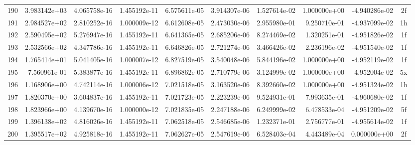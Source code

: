 \documentclass[10pt,aspectratio=1610]{beamer} %
\begin{document}
\begin{frame}
\begin{table}[htbp]
{\begin{tabular}{r r r r r r r r r c}
    190 & 3.983142e+03 & 4.065758e-16 & 1.455192e-11 & 6.575611e-05 & 3.914307e-06 & 1.527614e-02 & 1.000000e+00 & -4.940286e-02 & 2f \\
    191 & 2.984527e+02 & 2.810252e-16 & 1.000009e-12 & 6.612608e-05 & 2.473030e-06 & 2.955980e-01 & 9.250710e-01 & -4.937099e-02 & 1h \\
    192 & 2.590495e+02 & 5.276947e-16 & 1.455192e-11 & 6.641365e-05 & 2.685206e-06 & 8.274469e-02 & 1.320251e-01 & -4.951826e-02 & 1f \\
    193 & 2.532566e+02 & 4.347786e-16 & 1.455192e-11 & 6.646826e-05 & 2.721274e-06 & 3.466426e-02 & 2.236196e-02 & -4.951540e-02 & 1f \\
    194 & 1.765414e+01 & 5.041405e-16 & 1.000007e-12 & 6.827519e-05 & 3.540048e-06 & 5.844196e-02 & 1.000000e+00 & -4.952119e-02 & 1f \\
    195 & 7.560961e-01 & 5.383877e-16 & 1.455192e-11 & 6.896862e-05 & 2.710779e-06 & 3.124999e-02 & 1.000000e+00 & -4.952004e-02 & 5x \\
    196 & 1.168906e+00 & 4.742114e-16 & 1.000006e-12 & 7.021518e-05 & 3.163520e-06 & 8.392660e-02 & 1.000000e+00 & -4.951324e-02 & 1h \\
    197 & 1.820370e+00 & 3.604837e-16 & 1.455192e-11 & 7.021723e-05 & 2.223239e-06 & 9.524931e-01 & 7.993635e-01 & -4.960680e-02 & 1f \\
    198 & 1.823966e+00 & 4.139670e-16 & 1.000000e-12 & 7.021835e-05 & 2.247188e-06 & 6.249999e-02 & 6.478533e-04 & -4.951209e-02 & 5f \\
    199 & 1.396138e+02 & 4.816026e-16 & 1.455192e-11 & 7.062518e-05 & 2.546685e-06 & 1.232371e-01 & 2.756777e-01 & -4.955614e-02 & 1f \\
    200 & 1.395517e+02 & 4.925818e-16 & 1.455192e-11 & 7.062627e-05 & 2.547619e-06 & 6.528403e-04 & 4.443489e-04 & 0.000000e+00  & 2f \\
    \bottomrule
    \end{tabular}%
    }
    \label{tab:solver-log}
    \end{table}
\end{frame}
\end{document}
